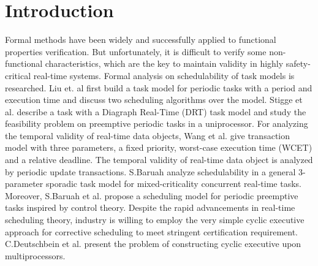\documentclass[conference]{IEEEtran}
\begin{document}
\section{Introduction}
Formal methods have been widely and successfully applied to functional properties verification. But unfortunately, it is difficult to verify some non-functional characteristics, which are the key to maintain validity in highly safety-critical real-time systems. Formal analysis on schedulability of task models is researched. Liu et. al \cite{DBLP:journals/jacm/LiuL73} first build a task model for periodic tasks with a period and execution time and discuss two scheduling algorithms over the model. Stigge et al. \cite{DBLP:conf/rtas/StiggeEGY11} describe a task with a Diagraph Real-Time (DRT) task model and study the feasibility problem on preemptive periodic tasks in a uniprocessor. For analyzing the temporal validity of real-time data objects, Wang et al. \cite{DBLP:journals/computing/WangLHSM13} give transaction model with three parameters, a fixed priority, worst-case execution time (WCET) and a relative deadline. The temporal validity of real-time data object is  analyzed by periodic update transactions. S.Baruah \cite{DBLP:conf/rtss/Baruah16} analyze schedulability in a general 3-parameter sporadic task model \cite{DBLP:journals/csur/BurnsD17} for mixed-criticality concurrent real-time tasks. Moreover, S.Baruah et al. \cite{DBLP:conf/rtns/2017} propose a scheduling model for periodic preemptive tasks inspired by control theory. Despite the rapid advancements in real-time scheduling theory, industry is willing to employ the very simple cyclic executive approach \cite{DBLP:journals/rts/BakerS89} for corrective scheduling to meet stringent certification requirement. C.Deutschbein et al. \cite{DBLP:conf/setta/2017} present the problem of constructing cyclic executive upon multiprocessors.
\end{document}
